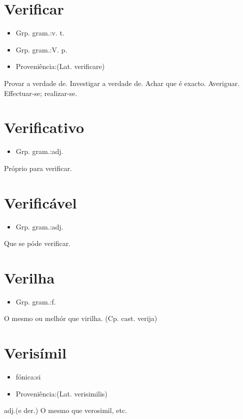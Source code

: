 \documentclass{article}
\begin{document}
\section{Verificar}
\begin{itemize}
\item {Grp. gram.:v. t.}
\end{itemize}
\begin{itemize}
\item {Grp. gram.:V. p.}
\end{itemize}
\begin{itemize}
\item {Proveniência:(Lat. \textunderscore verificare\textunderscore )}
\end{itemize}
Provar a verdade de.
Investigar a verdade de.
Achar que é exacto.
Averiguar.
Effectuar-se; realizar-se.
\section{Verificativo}
\begin{itemize}
\item {Grp. gram.:adj.}
\end{itemize}
Próprio para verificar.
\section{Verificável}
\begin{itemize}
\item {Grp. gram.:adj.}
\end{itemize}
Que se póde verificar.
\section{Verilha}
\begin{itemize}
\item {Grp. gram.:f.}
\end{itemize}
O mesmo ou melhór que \textunderscore virilha\textunderscore .
(Cp. cast. \textunderscore verija\textunderscore )
\section{Verisímil}
\begin{itemize}
\item {fónica:si}
\end{itemize}
\begin{itemize}
\item {Proveniência:(Lat. \textunderscore verisimilis\textunderscore )}
\end{itemize}
\textunderscore adj.\textunderscore  (e der.)
O mesmo que \textunderscore verosimil\textunderscore , etc.
\end{document}
